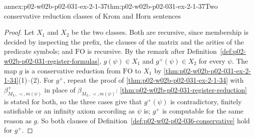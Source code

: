 \begin{annexitem}{annex:p02-w02b-p02-031-ex-2-1-37}{thm:p02-w02b-p02-031-ex-2-1-37}{Two conservative reduction classes of Krom and Horn sentences}
\begin{proof}
Let \(X_1\) and \(X_2\) be the two classes.  Both are recursive, since
membership is decided by inspecting the prefix, the clauses of the matrix and
the arities of the predicate symbols; and \(\mathrm{FO}\) is recursive.  By
the remark after Definition~\ref{def:p02-w02b-p02-031-register-formulas},
\(g(\psi)\in X_1\) and \(g^{+}(\psi)\in X_2\) for every \(\psi\).  The map
\(g\) is a conservative reduction from \(\mathrm{FO}\) to \(X_1\) by
\cref{thm:p02-w02b-p02-031-ex-2-1-34}(1)--(2).  For \(g^{+}\), repeat the
proof of \cref{thm:p02-w02b-p02-031-ex-2-1-34} with
\(\beta^{+}_{M_L,\prec,m(\psi)}\) in place of \(\beta_{M_L,\prec,m(\psi)}\):
\cref{thm:p02-w02b-p02-031-register-reduction} is stated for both, so the three
cases give that \(g^{+}(\psi)\) is contradictory, finitely satisfiable or an
infinity axiom according as \(\psi\) is; \(g^{+}\) is computable for the same
reason as \(g\).  So both clauses of
Definition~\ref{def:p02-w02-p02-036-conservative} hold for \(g^{+}\).
\end{proof}
\end{annexitem}

